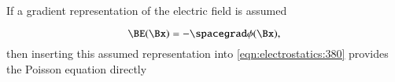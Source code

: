 %
%

If a gradient representation of the electric field is assumed

\begin{dmath}\label{eqn:electrostatics_electricPotential:561}
\BE(\Bx) = -\spacegrad \phi(\Bx),
\end{dmath}
then
inserting
this assumed representation into \cref{eqn:electrostatics:380} provides the
Poisson equation directly



